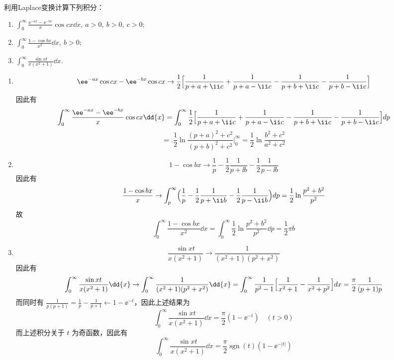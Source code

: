 \begin{question}
利用Laplace变换计算下列积分：
\begin{enumerate}
  \item \(\displaystyle\int_0^\infty \frac{\ee^{-a x}-\ee^{-b x}}{x}\cos c x\dd{x},\ a>0,\ b>0,\ c>0\);

  \item \(\displaystyle\int_0^\infty \frac{1-\cos b x}{x^2}\dd{x},\ b>0\);

  \item \(\displaystyle\int_0^\infty \frac{\sin x t}{x(x^2+1)}\dd{x}\).
\end{enumerate}
\begin{solution}
\begin{enumerate}
  \item \[ \ee^{-a x}\cos c x - \ee^{-b x}\cos c x \to \frac12\Bigl[\frac1{p+a+\ii c}+\frac1{p+a-\ii c}-\frac1{p+b+\ii c}-\frac1{p+b-\ii c}\Bigr] \]因此有 \[ \int_0^\infty \frac{\ee^{-a x}-\ee^{-b x}}{x}\cos c x\dd{x} = \int_0^\infty \frac12\Bigl[\frac1{p+a+\ii c}+\frac1{p+a-\ii c}-\frac1{p+b+\ii c}-\frac1{p+b-\ii c}\Bigr]dp \] \[ = \bigl.\frac12\ln\frac{(p+a)^2+c^2}{(p+b)^2+c^2}\bigr|_0^\infty = \frac12\ln\frac{b^2+c^2}{a^2+c^2} \]

  \item \[ 1-\cos b x \to \frac1p-\frac12\frac1{p+\ii b}-\frac12\frac1{p-\ii b} \]因此有 \[ \frac{1-\cos b x}{x} \to \int_p^\infty \Bigl(\frac1p-\frac12\frac1{p+\ii b}-\frac12\frac1{p-\ii b}\Bigr)dp = \frac12\ln\frac{p^2+b^2}{p^2} \]故 \[ \int_0^\infty \frac{1-\cos b x}{x^2}\dd{x} = \int_0^\infty \frac12\ln\frac{p^2+b^2}{p^2}\dd{p} = \frac12\pi b \]

  \item \[ \frac{\sin x t}{x(x^2+1)} \to \frac1{(x^2+1)(p^2+x^2)} \]因此有 \[ \int_0^\infty \frac{\sin x t}{x(x^2+1)}\dd{x} \to \int_0^\infty \frac1{(x^2+1)(p^2+x^2)}\dd{x} = \int_0^\infty \frac1{p^2-1}\Bigl[\frac1{x^2+1}-\frac1{x^2+p^2}\Bigr]dx = \frac{\pi}{2}\frac1{(p+1)p} \]而同时有 \(\displaystyle\frac1{p(p+1)} = \frac1p-\frac1{p+1} \gets 1-\ee^{-t}\)，因此上述结果为 \[ \int_0^\infty \frac{\sin x t}{x(x^2+1)}\dd{x} = \frac{\pi}{2}(1-\ee^{-t})\quad (t>0) \]而上述积分关于 \(t\) 为奇函数，因此有 \[ \int_0^\infty \frac{\sin x t}{x(x^2+1)}\dd{x} = \frac{\pi}{2}\operatorname{sgn}(t)(1-\ee^{-|t|}) \]
\end{enumerate}
\end{solution}
\end{question}

